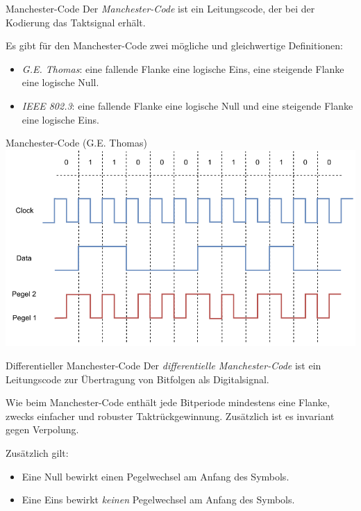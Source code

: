 \begin{defi}{Manchester-Code}
    Der \emph{Manchester-Code} ist ein Leitungscode, der bei der Kodierung das Taktsignal erhält.

    Es gibt für den Manchester-Code zwei mögliche und gleichwertige Definitionen:
    \begin{itemize}
        \item \emph{G.E. Thomas}: eine fallende Flanke eine logische Eins, eine steigende Flanke eine logische Null.
        \item \emph{IEEE 802.3}: eine fallende Flanke eine logische Null und eine steigende Flanke eine logische Eins.
    \end{itemize}
\end{defi}

\begin{example}{Manchester-Code (G.E. Thomas)}
    \centering
    \includegraphics[width=.9\textwidth]{includes/figures/example_manchester.pdf}
\end{example}

\begin{defi}{Differentieller Manchester-Code}
    Der \emph{differentielle Manchester-Code} ist ein Leitungscode zur Übertragung von Bitfolgen als Digitalsignal.

    Wie beim Manchester-Code enthält jede Bitperiode mindestens eine Flanke, zwecks einfacher und robuster Taktrückgewinnung.
    Zusätzlich ist es invariant gegen Verpolung.

    Zusätzlich gilt:
    \begin{itemize}
        \item Eine Null bewirkt einen Pegelwechsel am Anfang des Symbols.
        \item Eine Eins bewirkt \emph{keinen} Pegelwechsel am Anfang des Symbols.
    \end{itemize}
\end{defi}

